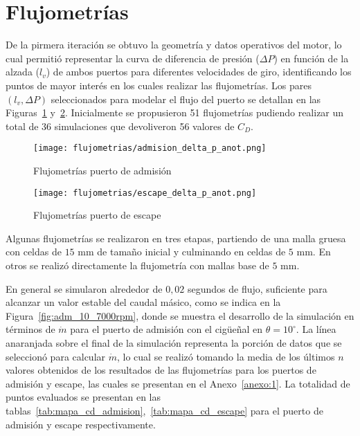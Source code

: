 \section{Flujometrías}

De la pirmera iteración se obtuvo la geometría y datos operativos del motor, lo
cual permitió representar la curva de diferencia de presión ($\Delta P$) en
función de la alzada ($l_{v}$) de ambos puertos para diferentes velocidades de
giro, identificando los puntos de mayor interés en los cuales realizar las
flujometrías.
%
Los pares $(l_{v}, \Delta P)$ seleccionados para modelar el flujo del puerto se
detallan en las Figuras~\ref{fig:delta_p_admision} y~\ref{fig:delta_p_escape}.
%
Inicialmente se propusieron 51 flujometrías pudiendo realizar un total de 36
simulaciones que devoliveron 56 valores de $C_{D}$.

\begin{figure}[h]
  \centering
  \texttt{[image: flujometrias/admision\_delta\_p\_anot.png]}
  \caption{Flujometrías puerto de admisión}\label{fig:delta_p_admision}
\end{figure}

\begin{figure}[h]
  \centering
  \texttt{[image: flujometrias/escape\_delta\_p\_anot.png]}
  \caption{Flujometrías puerto de escape}\label{fig:delta_p_escape}
\end{figure}


Algunas flujometrías se realizaron en tres etapas, partiendo de una malla gruesa
con celdas de $15$ mm de tamaño inicial y culminando en celdas de $5$ mm.
%
En otros se realizó directamente la flujometría con mallas base de $5$ mm.

En general se simularon alrededor de $0,02$ segundos de flujo, suficiente para
alcanzar un valor estable del caudal másico, como se indica en la
Figura~\ref{fig:adm_10_7000rpm}, donde se muestra el desarrollo de la simulación
en términos de $\dot{m}$ para el puerto de admisión con el cigüeñal en
$\theta=10^{\circ}$.
%
La línea anaranjada sobre el final de la simulación representa la porción de
datos que se seleccionó para calcular $\dot{m}$, lo cual se realizó tomando la
media de los últimos $n$ valores obtenidos de los resultados de las flujometrías
para los puertos de admisión y escape, las cuales se presentan en el
Anexo~\ref{anexo:1}.
%
La totalidad de puntos evaluados se presentan en las
tablas~\ref{tab:mapa_cd_admision},~\ref{tab:mapa_cd_escape} para el puerto de
admisión y escape respectivamente.

